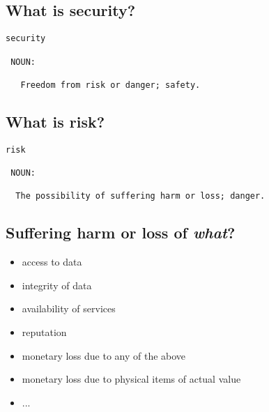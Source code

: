 \documentclass[xga]{xdvislides}
\begin{document}
% 

\subsection{What is security?}
\Huge
\begin{verbatim}
security

 NOUN:

   Freedom from risk or danger; safety.
\end{verbatim}
\Normalsize

\subsection{What is risk?}
\Huge
\begin{verbatim}
risk

 NOUN:

  The possibility of suffering harm or loss; danger.
\end{verbatim}
\Normalsize


\subsection{Suffering harm or loss of {\em what}?}

\begin{itemize}
	\item access to data
	\item integrity of data
	\item availability of services
	\item reputation
	\item monetary loss due to any of the above
	\item monetary loss due to physical items of actual value
	\item ...
\end{itemize}
\end{document}
